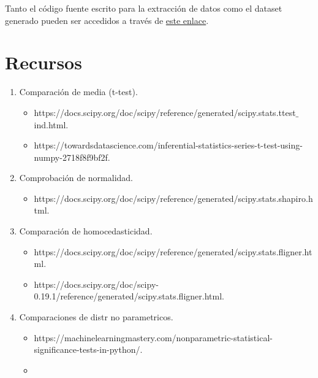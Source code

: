 \documentclass[12pt]{article}
\providecommand{\tightlist}{%
  \setlength{\itemsep}{0pt}\setlength{\parskip}{0pt}}
\begin{document}
Tanto el código fuente escrito para la extracción de datos como el
dataset generado pueden ser accedidos a través de
\href{https://github.com/raquel8893/Tipologia-PRA2}{este enlace}.

\hypertarget{recursos}{%
\section{Recursos}\label{recursos}}


\begin{enumerate}
\def\labelenumi{\arabic{enumi}.}
\tightlist
\item
Comparación de media (t-test).\\
\begin{itemize}
\tightlist
\item
  \text https://docs.scipy.org/doc/scipy/reference/generated/scipy.stats.ttest$\_$ind.html.\\
\item
  \text https://towardsdatascience.com/inferential-statistics-series-t-test-using-numpy-2718f8f9bf2f.\\ 
\end{itemize}
\item
Comprobación de normalidad.\\
\begin{itemize}
\tightlist
\item
  \text https://docs.scipy.org/doc/scipy/reference/generated/scipy.stats.shapiro.html.\\ 
\end{itemize}
\item
Comparación de homocedasticidad.\\
\begin{itemize}
\tightlist
\item
  \text https://docs.scipy.org/doc/scipy/reference/generated/scipy.stats.fligner.html.\\ 
\item
  \text https://docs.scipy.org/doc/scipy-0.19.1/reference/generated/scipy.stats.fligner.html.\\ 
\end{itemize}
\item
Comparaciones de distr no parametricos.\\
\begin{itemize}
\tightlist
\item
  \text https://machinelearningmastery.com/nonparametric-statistical-significance-tests-in-python/.\\
\item

\end{itemize}
\end{enumerate}
\end{document}

